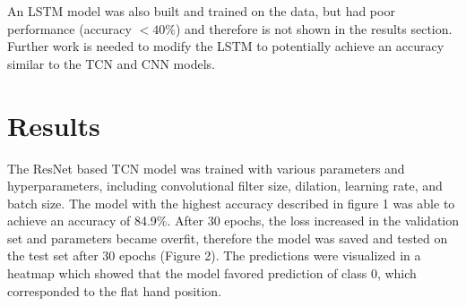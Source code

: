 \documentclass[conference]{IEEEtran}
\begin{document}
An LSTM model was also built and trained on the data, but had poor performance (accuracy $<40\%$) and therefore is not shown in the results section. Further work is needed to modify the LSTM to potentially achieve an accuracy similar to the TCN and CNN models. 

\section{Results}

The ResNet based TCN model was trained with various parameters and hyperparameters, including convolutional filter size, dilation, learning rate, and batch size. The model with the highest accuracy described in figure 1 was able to achieve an accuracy of 84.9\%. After 30 epochs, the loss increased in the validation set and parameters became overfit, therefore the model was saved and tested on the test set after 30 epochs (Figure 2). The predictions were visualized in a heatmap which showed that the model favored prediction of class 0, which corresponded to the flat hand position. 
\end{document}
